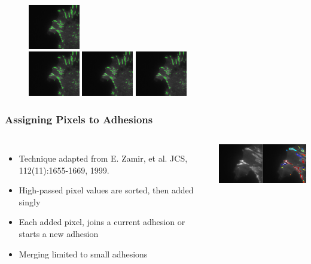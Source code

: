 \documentclass{beamer}
\begin{document}
\begin{frame}
\begin{figure}
		\includegraphics[width=0.2\textwidth]{figures/finding/thresh_examples/07.png}
		\\
		\includegraphics[width=0.2\textwidth]{figures/finding/thresh_examples/08.png}
		\includegraphics[width=0.2\textwidth]{figures/finding/thresh_examples/09.png}
		\includegraphics[width=0.2\textwidth]{figures/finding/thresh_examples/10.png}
	\end{figure}
\end{frame}

\begin{frame}
	\frametitle{Assigning Pixels to Adhesions}
	\begin{columns}
		\begin{itemize}
		\item Technique adapted from E. Zamir, et al. JCS, 112(11):1655-1669, 1999.
		\item High-passed pixel values are sorted, then added singly
		\item Each added pixel, joins a current adhesion or starts a new adhesion
		\item Merging limited to small adhesions
		\end{itemize}
		\includegraphics[width=\textwidth]{figures/finding/ad_pixels_example}
	\end{columns}
\end{frame}
\end{document}

